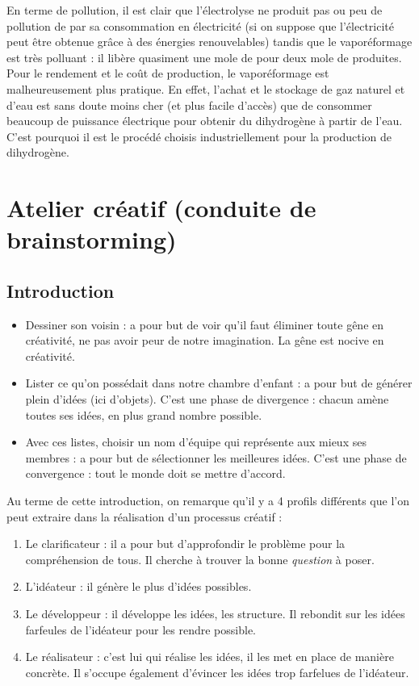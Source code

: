 En terme de pollution, il est clair que l'électrolyse ne produit
pas ou peu de pollution de par sa consommation en électricité
(si on suppose que l'électricité peut être obtenue grâce à des énergies renouvelables)
tandis que le vaporéformage est très polluant : il libère quasiment une mole de 
pour deux mole de  produites. Pour le rendement et le coût de production,
le vaporéformage est malheureusement plus pratique. En effet, l'achat et le stockage
de gaz naturel et d'eau est sans doute moins cher (et plus facile d'accès) que
de consommer beaucoup de puissance électrique pour obtenir du dihydrogène à partir
de l'eau. C'est pourquoi il est le procédé choisis industriellement pour la production
de dihydrogène.

\section{Atelier créatif (conduite de brainstorming)}
\subsection{Introduction}
\begin{itemize}
	\item Dessiner son voisin : a pour but de voir qu'il faut éliminer toute gêne en
	créativité, ne pas avoir peur de notre imagination. La gêne est nocive en créativité.
	\item Lister ce qu'on possédait dans notre chambre d'enfant : a pour but de générer
	plein d'idées (ici d'objets). C'est une phase de divergence : chacun amène toutes
	ses idées, en plus grand nombre possible.
	\item Avec ces listes, choisir un nom d'équipe qui représente aux mieux ses membres
	: a pour but de sélectionner les meilleures idées. C'est une phase de convergence :
	tout le monde doit se mettre d'accord.
\end{itemize}

Au terme de cette introduction, on remarque qu'il y a 4 profils différents que l'on peut
extraire dans la réalisation d'un processus créatif :

\begin{enumerate}
	\item Le clarificateur : il a pour but d'approfondir le problème pour la compréhension de tous.
	Il cherche à trouver la bonne \textit{question} à poser.
	\item L'idéateur : il génère le plus d'idées possibles.
	\item Le développeur : il développe les idées, les structure. Il rebondit sur les idées farfeules
	de l'idéateur pour les rendre possible.
	\item Le réalisateur : c'est lui qui réalise les idées, il les met en place de manière concrète.
	Il s'occupe également d'évincer les idées trop farfelues de l'idéateur.
\end{enumerate}

